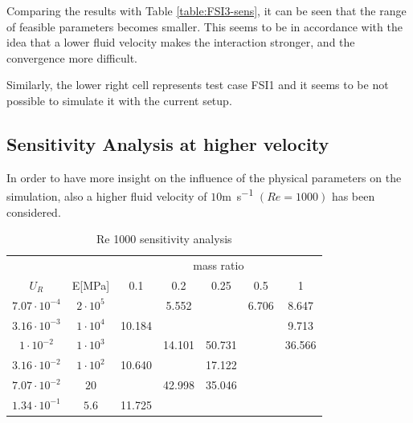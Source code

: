 Comparing the results with Table \ref{table:FSI3-sens}, it can be seen that the range of feasible parameters becomes smaller. This seems to be in accordance with the idea that a lower fluid velocity makes the interaction stronger, and the convergence more difficult.

Similarly, the lower right cell represents test case FSI1 and it seems to be not possible to simulate it with the current setup.


\subsection{Sensitivity Analysis at higher velocity}

In order to have more insight on the influence of the physical parameters on the simulation, also a higher fluid velocity of $10$\si{m.s^{-1}} $(Re=1000)$ has been considered.


%
\begin{table}[!htb]
	\begin{center}
		\begin{tabular}{ c | c | c c c c c |} 
			&  & \multicolumn{5}{c}{mass ratio} \\
			
			$U_R$ & E[\si{MPa}] & 0.1 & 0.2 & 0.25 & 0.5 & 1 \\
			\hline
			
			$7.07\cdot 10^{-4}$ & $2\cdot 10^{5}$ & \cellcolor{green!10} & \cellcolor{green!10}5.552 & \cellcolor{green!10} & \cellcolor{green!10}6.706 & \cellcolor{green!10}8.647 \\
			$3.16\cdot 10^{-3}$ & $1\cdot 10^{4}$ & \cellcolor{green!10}10.184 & \cellcolor{green!10} & \cellcolor{green!10} & \cellcolor{green!10} & \cellcolor{green!10}9.713 \\        
			$1\cdot 10^{-2}$ & $1\cdot 10^{3}$ & \cellcolor{green!10} & \cellcolor{green!10}14.101 & \cellcolor{green!10}50.731 & \cellcolor{green!10} & \cellcolor{green!10}36.566 \\
			$3.16\cdot 10^{-2}$ & $1\cdot 10^{2}$ & \cellcolor{green!10}10.640 & \cellcolor{green!10} & \cellcolor{green!10}17.122 & \cellcolor{red!10} & \cellcolor{red!10} \\
			$7.07\cdot 10^{-2}$ & $20$ & \cellcolor{green!10} & \cellcolor{green!10}42.998 & \cellcolor{green!10}35.046 & \cellcolor{red!10} & \cellcolor{red!10} \\
			$1.34\cdot 10^{-1}$ & $5.6$ & \cellcolor{green!10}11.725 & \cellcolor{red!10} & \cellcolor{red!10} & \cellcolor{red!10} & \cellcolor{red!10} \\
			\hline                        
		\end{tabular}
	\end{center}
	\caption{Re 1000 sensitivity analysis}
	\label{table:Re1000-sens}
\end{table}

